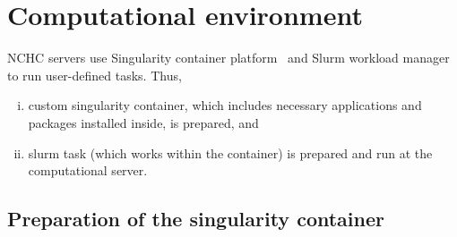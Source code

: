 \cleardoublepage
\section{Computational environment}
\label{sec:env}

NCHC servers use Singularity container platform~\cite{singularity} and Slurm workload manager~\cite{slurm} to run user-defined tasks. Thus,  
\begin{enumerate}[(i)]
    \item custom singularity container, which includes necessary applications and packages installed inside, is prepared, and
    \item slurm task (which works within the container) is prepared and run at the computational server.
\end{enumerate}

\subsection{Preparation of the singularity container}
\label{subsec:prepCont}

